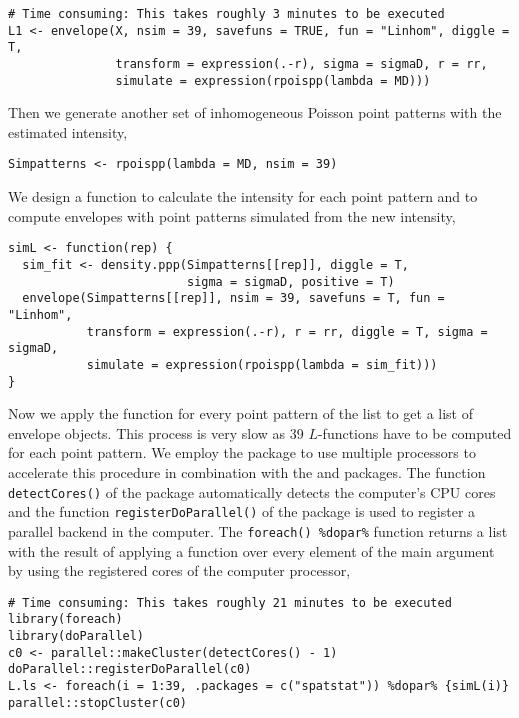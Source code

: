 \begin{verbatim}
# Time consuming: This takes roughly 3 minutes to be executed 
L1 <- envelope(X, nsim = 39, savefuns = TRUE, fun = "Linhom", diggle = T,
               transform = expression(.-r), sigma = sigmaD, r = rr, 
               simulate = expression(rpoispp(lambda = MD)))
\end{verbatim}

Then we generate another set of inhomogeneous Poisson point patterns with the estimated intensity,

\begin{verbatim}
Simpatterns <- rpoispp(lambda = MD, nsim = 39)
\end{verbatim}

We design a function to calculate the intensity for each point pattern and to compute envelopes with point patterns simulated from the new intensity,

\begin{verbatim}
simL <- function(rep) {
  sim_fit <- density.ppp(Simpatterns[[rep]], diggle = T, 
                         sigma = sigmaD, positive = T)
  envelope(Simpatterns[[rep]], nsim = 39, savefuns = T, fun = "Linhom", 
           transform = expression(.-r), r = rr, diggle = T, sigma = sigmaD,
           simulate = expression(rpoispp(lambda = sim_fit)))
}
\end{verbatim}

Now we apply the function for every point pattern of the list to get a list of envelope objects. This process is very slow as 39 \(L\)-functions have to be computed for each point pattern. We employ the package  to use multiple processors to accelerate this procedure in combination with the  and  packages. The function \texttt{detectCores()} of the package  automatically detects the computer's CPU cores and the function \texttt{registerDoParallel()} of the  package is used to register a parallel backend in the computer. The \texttt{foreach()\ \%dopar\%} function returns a list with the result of applying a function over every element of the main argument by using the registered cores of the computer processor,

\begin{verbatim}
# Time consuming: This takes roughly 21 minutes to be executed 
library(foreach)
library(doParallel)
c0 <- parallel::makeCluster(detectCores() - 1)
doParallel::registerDoParallel(c0)
L.ls <- foreach(i = 1:39, .packages = c("spatstat")) %dopar% {simL(i)}
parallel::stopCluster(c0)
\end{verbatim}

